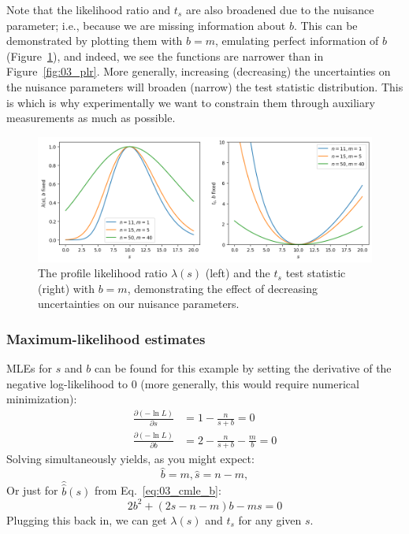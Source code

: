 Note that the likelihood ratio and $t_s$ are also broadened due to the nuisance parameter; i.e., because we are missing information about $b$. 
This can be demonstrated by plotting them with $b = m$, emulating perfect information of $b$ (Figure~\ref{fig:03_plr_nob}), and indeed, we see the functions are narrower than in Figure~\ref{fig:03_plr}.
More generally, increasing (decreasing) the uncertainties on the nuisance parameters will broaden (narrow) the test statistic distribution.
This is which is why experimentally we want to constrain them through auxiliary measurements as much as possible.

\begin{figure}[tb]
    \centering
    \includegraphics[width=\textwidth]{figures/03-Stats/01-intro/3.png}
    \caption{The profile likelihood ratio $\lambda(s)$ (left) and the $t_s$ test statistic (right) with $b = m$, demonstrating the effect of decreasing uncertainties on our nuisance parameters.}
    \label{fig:03_plr_nob}
\end{figure}

\subsubsection{Maximum-likelihood estimates}

MLEs for $s$ and $b$ can be found for this example by setting the derivative of the negative log-likelihood to 0 (more generally, this would require numerical minimization):
\begin{align}
\label{eq:03_cmle_b}
\frac{\partial (-\ln L)}{\partial s} &= 1 - \frac{n}{s+b} = 0 \\
\frac{\partial (-\ln L)}{\partial b} &= 2 - \frac{n}{s+b} - \frac{m}{b} = 0
\end{align}
Solving simultaneously yields, as you might expect:
\begin{equation}
\label{eq:03_mles}
\hat{b} = m, \hat{s} = n - m,
\end{equation}
Or just for $\hat{\hat{b}}(s)$ from Eq.~\ref{eq:03_cmle_b}:
\begin{equation}
\label{eq:03_cmle_b_f}
2b^2 + (2s - n - m)b - ms = 0
\end{equation}
Plugging this back in, we can get $\lambda(s)$ and $t_s$ for any given $s$.

